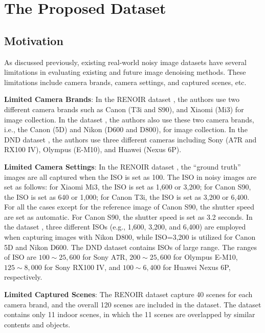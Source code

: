\section{The Proposed Dataset}

\subsection{Motivation}
As discussed previously, existing real-world noisy image datasets \cite{RENOIR2014,crosschannel2016,dnd2017} have several limitations in evaluating existing and future image denoising methods. These limitations include camera brands, camera settings, and captured scenes, etc.

\textbf{Limited Camera Brands}: In the RENOIR dataset \cite{RENOIR2014}, the authors use two different camera brands such as Canon (T3i and S90), and Xiaomi (Mi3) for image collection. In the dataset \cite{crosschannel2016}, the authors also use these two camera brands, i.e., the Canon (5D) and Nikon (D600 and D800), for image collection. In the DND dataset \cite{dnd2017}, the authors use three different cameras including Sony (A7R and RX100 IV),  Olympus (E-M10), and Huawei (Nexus 6P).

\textbf{Limited Camera Settings}: In the RENOIR dataset \cite{RENOIR2014}, the ``ground truth'' images are all captured when the ISO is set as 100. The ISO in noisy images are set as follows: for Xiaomi Mi3, the ISO is set as 1,600 or 3,200; for Canon S90, the ISO is set as 640 or 1,000; for Canon T3i, the ISO is set as 3,200 or 6,400. For all the cases except for the reference image of Canon S90, the shutter speed are set as automatic. For Canon S90, the shutter speed is set as 3.2 seconds. In the dataset \cite{crosschannel2016}, three different ISOs (e.g., 1,600, 3,200, and 6,400) are employed when capturing images with Nikon D800, while ISO=3,200 is utilized for Canon 5D and Nikon D600. The DND dataset \cite{dnd2017} contains ISOs of large range. The ranges of ISO are $100\sim25,600$ for Sony A7R, $200\sim25,600$ for Olympus E-M10, $125\sim8,000$ for Sony RX100 IV, and $100\sim6,400$ for Huawei Nexus 6P, respectively. 

\textbf{Limited Captured Scenes}: The RENOIR dataset \cite{RENOIR2014} capture 40 scenes for each camera brand, and the overall 120 scenes are included in the dataset.  The dataset \cite{crosschannel2016} contains only 11 indoor scenes, in which the 11 scenes are overlapped by similar contents and objects. 



